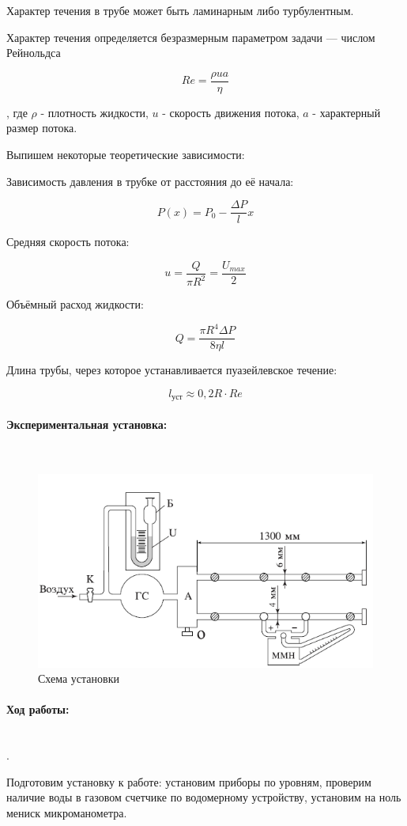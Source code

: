 \documentclass[a4paper, 12pt]{article}
\newcommand{\parag}[1]{\paragraph*{#1:}}
\newcounter{Points}
\newcommand{\point}{\arabic{Points}. \addtocounter{Points}{1}}
\begin{document}
Характер течения в трубе может быть ламинарным либо турбулентным. 

Характер течения определяется безразмерным параметром задачи — числом Рейнольдса

\[
    Re = \frac{\rho u a}{\eta}
\]

, где $\rho$ - плотность жидкости, $u$ - скорость движения потока, $a$ - характерный размер потока.

Выпишем некоторые теоретические зависимости:

Зависимость давления в трубке от расстояния до её начала:

\[
    P(x) = P_{0} - \frac{\Delta P}{l}x
\]

Средняя скорость потока:

\[
    u = \frac{Q}{\pi R^{2}} = \frac{U_{max}}{2}
\]

Объёмный расход жидкости:

\[
    Q = \frac{\pi R^{4} \Delta P}{8\eta l}
\]

Длина трубы, через которое устанавливается пуазейлевское течение:

\[
    l_{\text{уст}} \approx 0,2R\cdot Re
\]

\parag {Экспериментальная установка} ~

\begin{figure}[!h]
    \includegraphics[scale = 0.7]{Workplace}
    \centering
    \caption{Схема установки}
\end{figure}

\parag {Ход работы} ~\\

\point Подготовим установку к работе: установим приборы по уровням, проверим наличие воды в газовом счетчике по водомерному устройству, установим на ноль мениск микроманометра. 
\end{document}
